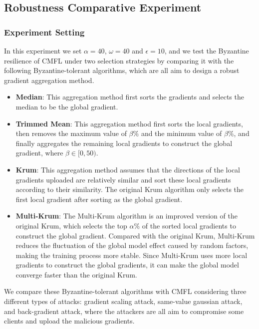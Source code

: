 \documentclass[10pt,journal,compsoc]{IEEEtran}
\begin{document}
\subsection{Robustness Comparative Experiment}\label{comparativeExperiment}


\subsubsection{Experiment Setting}

In this experiment we set $\alpha = 40$, $\omega=40$ and $\epsilon=10$, and we test the Byzantine resilience of CMFL under two selection strategies by comparing it with the following Byzantine-tolerant algorithms, which are all aim to design a robust gradient aggregation method.

\begin{itemize}
  \item \textbf{Median}\cite{pmlr-v80-yin18a}: This aggregation method first sorts the gradients and selects the median to be the global gradient.
  \item \textbf{Trimmed Mean}\cite{pmlr-v80-yin18a}: This aggregation method first sorts the local gradients, then removes the maximum value of $\beta\%$ and the minimum value of $\beta\%$, and finally aggregates the remaining local gradients to construct the global gradient, where $\beta \in [0,50)$.
  \item \textbf{Krum}\cite{Blanchard2017Byzantine}: This aggregation method assumes that the directions of the local gradients uploaded are relatively similar and sort these local gradients according to their similarity. The original Krum algorithm only selects the first local gradient after sorting as the global gradient.
  \item \textbf{Multi-Krum}\cite{Blanchard2017Byzantine}: The Multi-Krum algorithm is an improved version of the original Krum, which selects the top $\alpha\%$ of the sorted local gradients to construct the global gradient. Compared with the original Krum, Multi-Krum reduces the fluctuation of the global model effect caused by random factors, making the training process more stable. Since Multi-Krum uses more local gradients to construct the global gradients, it can make the global model converge faster than the original Krum.
\end{itemize}

We compare these Byzantine-tolerant algorithms with CMFL considering three different types of attacks: gradient scaling attack, same-value gaussian attack, and back-gradient attack, where the attackers are all aim to compromise some clients and upload the malicious gradients.
\end{document}
